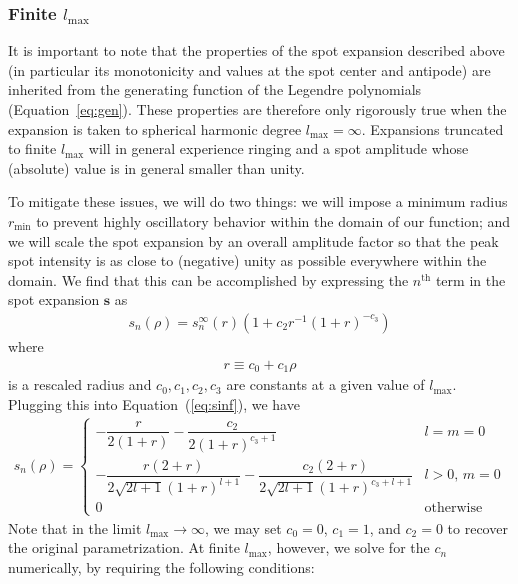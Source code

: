 \documentclass[modern]{aastex62}
\begin{document}
\subsubsection{Finite $l_{\mathrm{max}}$}
%
It is important to note that the
properties of the spot expansion described above
(in particular its monotonicity and values at the spot center and antipode)
are inherited from the generating function of the Legendre polynomials
(Equation~\ref{eq:gen}). These properties are therefore only rigorously
true when the expansion is taken to spherical
harmonic degree $l_{\mathrm{max}} = \infty$. Expansions truncated to finite
$l_{\mathrm{max}}$ will in general experience ringing and a spot amplitude
whose (absolute) value is in general smaller than unity.

To mitigate these issues, we will do two things: we will impose a minimum
radius $r_{\mathrm{min}}$ to prevent highly oscillatory behavior within
the domain of our function; and we will scale the spot expansion
by an overall amplitude factor so that
the peak spot intensity is as close to (negative) unity as possible
everywhere within the domain.
We find that this can be accomplished by expressing the
$n^{\mathrm{th}}$ term in the spot expansion $\mathbf{s}$ as
%
\begin{align}
    s_n(\rho) = s_n^\infty\left(r\right) \left(1 + c_2 r^{-1} \left(1 + r\right) ^ {-c_3}\right)
\end{align}
%
where
%
\begin{align}
    r \equiv c_0 + c_1\rho
\end{align}
%
is a rescaled radius and $c_0, c_1, c_2, c_3$ are constants at a given
value of $l_{\mathrm{max}}$.
%
Plugging this into Equation~(\ref{eq:sinf}), we have
%
\begin{align}
    \label{eq:s}
    s_{n}(\rho) =
    \begin{cases}
        -\dfrac{r}{2(1 + r)} - \dfrac{c_2}{2(1 + r)^{c_3 + 1}}
         & l = m = 0
        \\[1em]
        -\dfrac{r \left( 2 + r \right)}
        {2 \sqrt{2l + 1} (1 + r)^{l + 1}}
        - \dfrac{c_2\left( 2 + r \right)}
        {2 \sqrt{2l + 1} (1 + r)^{c_3 + l + 1}}
         & l > 0, \, m = 0
        \\[1em]
        0
         & \mathrm{otherwise}
    \end{cases}
\end{align}
%
Note that in the limit $l_{\mathrm{max}} \rightarrow \infty$, we may set
$c_0 = 0$, $c_1 = 1$, and $c_2 = 0$ to recover the original parametrization.
At finite $l_{\mathrm{max}}$, however, we solve for the $c_n$ numerically,
by requiring the following conditions:
\end{document}
